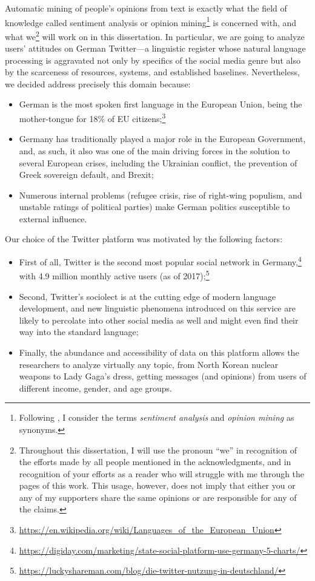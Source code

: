 Automatic mining of people's opinions from text is exactly what the
field of knowledge called sentiment analysis or opinion
mining\footnote{Following \citet{Liu:12}, I consider the terms
  \emph{sentiment analysis} and \emph{opinion mining} as synonyms.} is
concerned with, and what we\footnote{Throughout this dissertation, I
  will use the pronoun ``we'' in recognition of the efforts made by
  all people mentioned in the acknowledgments, and in recognition of
  your efforts as a reader who will struggle with me through the pages
  of this work.  This usage, however, does not imply that either you
  or any of my supporters share the same opinions or are responsible
  for any of the claims.} will work on in this dissertation.  In
particular, we are going to analyze users' attitudes on German
Twitter---a linguistic register whose natural language processing is
aggravated not only by specifics of the social media genre but also by
the scarceness of resources, systems, and established baselines.
Nevertheless, we decided address precisely this domain because:
\begin{itemize}
  \item German is the most spoken first language in the European
    Union, being the mother-tongue for 18\% of EU
    citizens;\footnote{\url{https://en.wikipedia.org/wiki/Languages_of_the_European_Union}}
  \item Germany has traditionally played a major role in the European
    Government, and, as such, it also was one of the main driving
    forces in the solution to several European crises, including the
    Ukrainian conflict, the prevention of Greek sovereign default, and
    Brexit;
  \item Numerous internal problems (refugee crisis, rise of right-wing
    populism, and unstable ratings of political parties) make German
    politics susceptible to external influence.
\end{itemize}

Our choice of the Twitter platform was motivated by the following
factors:
\begin{itemize}
  \item First of all, Twitter is the second most popular social
    network in
    Germany,\footnote{\url{https://digiday.com/marketing/state-social-platform-use-germany-5-charts/}}
    with 4.9 million monthly active users (as of
    2017);\footnote{\url{https://luckyshareman.com/blog/die-twitter-nutzung-in-deutschland/}}
  \item Second, Twitter's sociolect is at the cutting edge of modern
    language development, and new linguistic phenomena introduced on
    this service are likely to percolate into other social media as
    well and might even find their way into the standard language;
  \item Finally, the abundance and accessibility of data on this
    platform allows the researchers to analyze virtually any topic,
    from North Korean nuclear weapons to Lady Gaga's dress, getting
    messages (and opinions) from users of different income, gender,
    and age groups.
\end{itemize}

